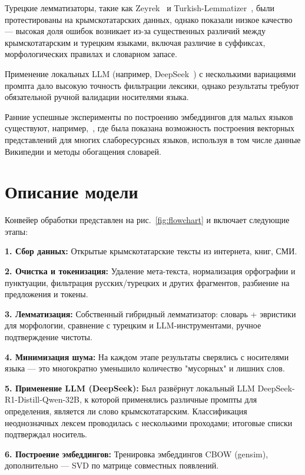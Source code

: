 \documentclass{article}
\begin{document}
Турецкие лемматизаторы, такие как Zeyrek~\cite{zeyreklem} и Turkish-Lemmatizer~\cite{turkishlemmatizer}, были протестированы на крымскотатарских данных, однако показали низкое качество — высокая доля ошибок возникает из-за существенных различий между крымскотатарским и турецким языками, включая различие в суффиксах, морфологических правилах и словарном запасе.

Применение локальных LLM (например, DeepSeek~\cite{deepseek2024}) с несколькими вариациями промпта дало высокую точность фильтрации лексики, однако результаты требуют обязательной ручной валидации носителями языка.

Ранние успешные эксперименты по построению эмбеддингов для малых языков существуют, например,~\cite{grave2018learning}, где была показана возможность построения векторных представлений для многих слаборесурсных языков, используя в том числе данные Википедии и методы обогащения словарей.

\section{Описание модели}
Конвейер обработки представлен на рис.~\ref{fig:flowchart} и включает следующие этапы:

\textbf{1. Сбор данных:}
Открытые крымскотатарские тексты из интернета, книг, СМИ.

\textbf{2. Очистка и токенизация:}
Удаление мета-текста, нормализация орфографии и пунктуации, фильтрация русских/турецких и других фрагментов, разбиение на предложения и токены.

\textbf{3. Лемматизация:}
Собственный гибридный лемматизатор: словарь + эвристики для морфологии, сравнение с турецким и LLM-инструментами, ручное подтверждение чистоты.

\textbf{4. Минимизация шума:}
На каждом этапе результаты сверялись с носителями языка — это многократно уменьшило количество "мусорных" и лишних слов.

\textbf{5. Применение LLM (DeepSeek):}
Был развёрнут локальный LLM DeepSeek-R1-Distill-Qwen-32B, к которой применялись различные промпты для определения, является ли слово крымскотатарским. Классификация неоднозначных лексем проводилась с несколькими проходами; итоговые списки подтверждал носитель.

\textbf{6. Построение эмбеддингов:}
Тренировка эмбеддингов CBOW (gensim), дополнительно — SVD по матрице совместных появлений.
\end{document}

